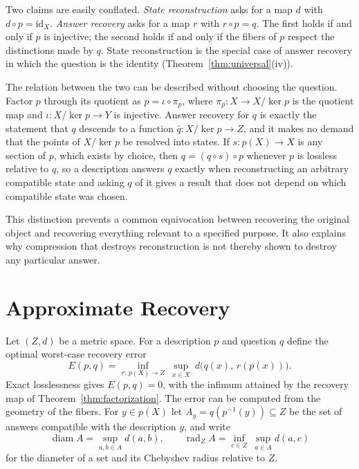 \documentclass[11pt]{article}
\theoremstyle{definition}
\theoremstyle{remark}
\newcommand{\diam}{\operatorname{diam}}
\newcommand{\rad}{\operatorname{rad}}
\begin{document}
Two claims are easily conflated. \emph{State reconstruction} asks for a map $d$ with $d\circ p=\mathrm{id}_X$. \emph{Answer recovery} asks for a map $r$ with $r\circ p=q$. The first holds if and only if $p$ is injective; the second holds if and only if the fibers of $p$ respect the distinctions made by $q$. State reconstruction is the special case of answer recovery in which the question is the identity (Theorem~\ref{thm:universal}(iv)).

The relation between the two can be described without choosing the question. Factor $p$ through its quotient as $p=\iota\circ\pi_p$, where $\pi_p:X\to X/\ker p$ is the quotient map and $\iota:X/\ker p\to Y$ is injective. Answer recovery for $q$ is exactly the statement that $q$ descends to a function $\bar q:X/\ker p\to Z$, and it makes no demand that the points of $X/\ker p$ be resolved into states. If $s:p(X)\to X$ is any section of $p$, which exists by choice, then $q=(q\circ s)\circ p$ whenever $p$ is lossless relative to $q$, so a description answers $q$ exactly when reconstructing an arbitrary compatible state and asking $q$ of it gives a result that does not depend on which compatible state was chosen.

This distinction prevents a common equivocation between recovering the original object and recovering everything relevant to a specified purpose. It also explains why compression that destroys reconstruction is not thereby shown to destroy any particular answer.

\section{Approximate Recovery}\label{sec:approximate}

Let $(Z,d)$ be a metric space. For a description $p$ and question $q$ define the optimal worst-case recovery error
\[
E(p,q)=\inf_{r:\,p(X)\to Z}\ \sup_{x\in X}\ d\bigl(q(x),\,r(p(x))\bigr).
\]
Exact losslessness gives $E(p,q)=0$, with the infimum attained by the recovery map of Theorem~\ref{thm:factorization}. The error can be computed from the geometry of the fibers. For $y\in p(X)$ let $A_y=q(p^{-1}(y))\subseteq Z$ be the set of answers compatible with the description $y$, and write
\[
\diam A=\sup_{a,b\in A}d(a,b),\qquad \rad_Z A=\inf_{c\in Z}\ \sup_{a\in A}d(a,c)
\]
for the diameter of a set and its Chebyshev radius relative to $Z$.
\end{document}
